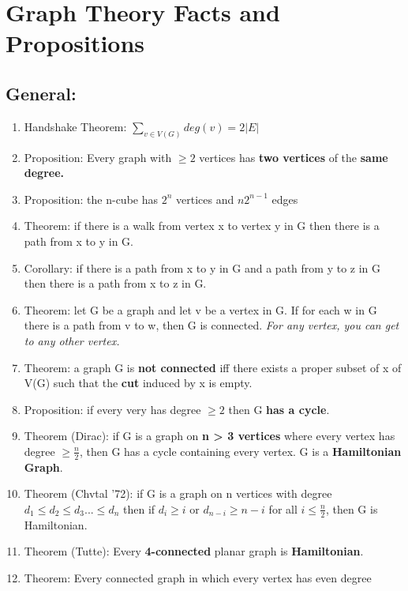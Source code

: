 \documentclass[]{article}
\author{}
\date{}
\begin{document}
\section{Graph Theory Facts and
Propositions}\label{graph-theory-facts-and-propositions}

\subsection{General:}\label{general}

\begin{enumerate}
\def\labelenumi{\arabic{enumi}.}
\itemsep1pt\parskip0pt
\item
  Handshake Theorem: $\sum_{v \in V(G)} deg(v) = 2|E|$
\item
  Proposition: Every graph with $\geq 2$ vertices has \textbf{two
  vertices} of the \textbf{same degree.}
\item
  Proposition: the n-cube has $2^n$ vertices and $n2^{n-1}$ edges
\item
  Theorem: if there is a walk from vertex x to vertex y in G then there
  is a path from x to y in G.
\item
  Corollary: if there is a path from x to y in G and a path from y to z
  in G then there is a path from x to z in G.
\item
  Theorem: let G be a graph and let v be a vertex in G. If for each w in
  G there is a path from v to w, then G is connected. \emph{For any
  vertex, you can get to any other vertex.}
\item
  Theorem: a graph G is \textbf{not connected} iff there exists a proper
  subset of x of V(G) such that the \textbf{cut} induced by x is empty.
\item
  Proposition: if every very has degree $\geq 2$ then G \textbf{has a
  cycle}.
\item
  Theorem (Dirac): if G is a graph on \textbf{n \textgreater{} 3
  vertices} where every vertex has degree $\geq \frac{n}{2}$, then G has
  a cycle containing every vertex. G is a \textbf{Hamiltonian Graph}.
\item
  Theorem (Chvtal '72): if G is a graph on n vertices with degree
  $d_1 \leq d_2 \leq d_3 ... \leq d_n$ then if $d_i \geq i$ or
  $d_{n-i} \geq n - i$ for all $i \leq \frac{n}{2}$, then G is
  Hamiltonian.
\item
  Theorem (Tutte): Every \textbf{4-connected} planar graph is
  \textbf{Hamiltonian}.
\item
  Theorem: Every connected graph in which every vertex has even degree

\end{enumerate}
\end{document}
